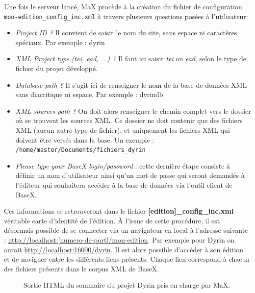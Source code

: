 \documentclass[a4paper,12pt,twoside]{book}
\begin{document}
Une fois le serveur lancé, MaX procède à la création du fichier de configuration \texttt{mon-edition\_config\_inc.xml}\label{config} à travers plusieurs questions posées à l'utilisateur:
\begin{itemize}
    \item \textit{Project ID ?} Il convient de saisir le nom du site, sans espace ni caractères spéciaux. Par exemple : dyrin
    \item \textit{XML Project type (tei, ead, ...) ?} Il faut ici saisir \textit{tei} ou \textit{ead}, selon le type de fichier du projet développé.
    \item \textit{Database path ? }Il s'agit ici de renseigner le nom de la base de données XML sans diacritique ni espace. Par exemple : dyrindb
    \item \textit{XML sources path ?} On doit alors renseigner le chemin complet vers le dossier où se trouvent les sources XML. Ce dossier ne doit contenir que des fichiers XML (aucun autre type de fichier), et uniquement les fichiers XML qui doivent être versés dans la base. Un exemple : \texttt{/home/master/Documents/fichiers\_dyrin}
    \item \textit{Please type your BaseX login/password} : cette dernière étape consiste à définir un nom d'utilisateur ainsi qu'un mot de passe qui seront demandés à l'éditeur qui souhaitera accéder à la base de données via l'outil client de BaseX.
\end{itemize}

Ces informations se retrouveront dans le fichier \textbf{[edition]\_config\_inc.xml} véritable carte d'identité de l'édition. À l'issue de cette procédure, il est désormais possible de se connecter via un navigateur en local à l'adresse suivante : \url{http://localhost:[numero-de-port]/mon-edition}. Par exemple pour Dyrin on aurait \url{http://localhost:16000/dyrin}. Il est alors possible d'accéder à son édition et de naviguer entre les différents liens présents. Chaque lien correspond à chacun des fichiers présents dans le corpus XML de BaseX.

\begin{figure}[H]
  \centering
    \caption{Sortie \acrshort{HTML} du sommaire du projet Dyrin pris en charge par MaX.}
\end{figure}
\end{document}

